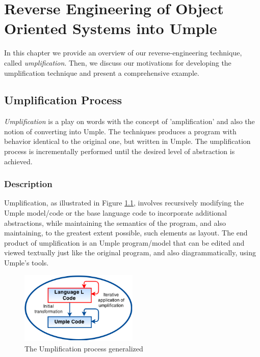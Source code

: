 \lhead{\emph{\leftmark}}  %
\chapter{Reverse Engineering of Object Oriented Systems into Umple}
\label{chap:core}

In this chapter we provide an overview of our reverse-engineering technique, called \textit{umplification}. Then, we discuss our motivations for developing the umplification technique and present a comprehensive example. 

\section{Umplification Process}

\textit{Umplification} is a play on words with the concept of 'amplification' and also the notion of converting into Umple. The techniques produces a program with behavior identical to the original one, but written in Umple. The umplification process is incrementally performed until the desired level of abstraction is achieved. 

\subsection{Description}
Umplification, as illustrated in Figure \ref{fig:umplificationLoop}, involves recursively modifying the Umple model/code or the base language code to incorporate additional abstractions, while maintaining the semantics of the program, and also maintaining, to the greatest extent possible, such elements as layout. The end product of umplification is an Umple program/model that can be edited and viewed textually just like the original program, and also diagrammatically, using Umple's tools. 

\begin{figure}[h]
\centering
\includegraphics[width=0.50\textwidth]{Figures/UmplificationProcess.png}
\caption{The Umplification process generalized}
\label{fig:umplificationLoop}
\end{figure}


